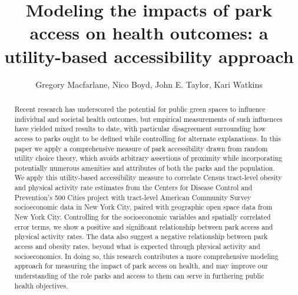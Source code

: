 \documentclass[shortAfour,sageh.bst]{sagej}
\begin{document}
\title{Modeling the impacts of park access on health outcomes: a utility-based
accessibility approach}


\author{Gregory Macfarlane, Nico Boyd, John E. Taylor, Kari Watkins}

\affiliation{\affilnum{}{}\\\affilnum{}{}\\\affilnum{}{}}



\begin{abstract}
Recent research has underscored the potential for public green spaces to
influence individual and societal health outcomes, but empirical
measurements of such influences have yielded mixed results to date, with
particular disagreement surrounding how access to parks ought to be
defined while controlling for alternate explanations. In this paper we
apply a comprehensive measure of park accessibility drawn from random
utility choice theory, which avoids arbitrary assertions of proximity
while incorporating potentially numerous amenities and attributes of
both the parks and the population. We apply this utility-based
accessibility measure to correlate Census tract-level obesity and
physical activity rate estimates from the Centers for Disease Control
and Prevention's 500 Cities project with tract-level American Community
Survey socioeconomic data in New York City, paired with geographic open
space data from New York City. Controlling for the socioeconomic
variables and spatially correlated error terms, we show a positive and
significant relationship between park access and physical activity
rates. The data also suggest a negative relationship between park access
and obesity rates, beyond what is expected through physical activity and
socioeconomics. In doing so, this research contributes a more
comprehensive modeling approach for measuring the impact of park access
on health, and may improve our understanding of the role parks and
access to them can serve in furthering public health objectives.
\end{abstract}


\maketitle
\end{document}
